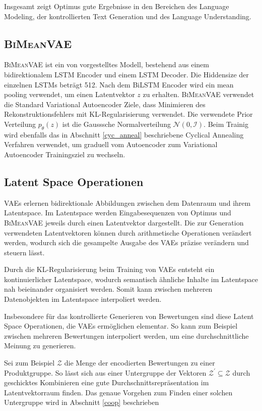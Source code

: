 Insgesamt zeigt Optimus gute Ergebnisse in den Bereichen des Language Modeling, der kontrollierten Text Generation und des Language Understanding.



\pagebreak
\subsection{\textsc{BiMeanVAE}}
\textsc{BiMeanVAE} ist ein von \citep{coop} vorgestelltes Modell, bestehend aus einem bidirektionalem LSTM Encoder und einem LSTM Decoder. 
Die Hiddensize der einzelnen LSTMs beträgt 512. Nach dem BiLSTM Encoder wird ein mean pooling verwendet, um einen Latentvektor $z$ zu erhalten.
\textsc{BiMeanVAE} verwendet die Standard Variational Autoencoder Ziele, dass Minimieren des Rekonstruktionsfehlers mit KL-Regularisierung verwendet.
Die verwendete Prior Verteilung $p_\theta(z)$ ist die Gausssche Normalverteilung $\mathcal{N}(0,\mathcal{I})$. 
Beim Trainig wird ebenfalls das in Abschnitt \ref{cyc_anneal} beschriebene Cyclical Annealing Verfahren verwendet, um graduell vom Autoencoder zum Variational Autoencoder Trainingsziel zu wechseln.


\subsection{Latent Space Operationen}
VAEs erlernen bidirektionale Abbildungen zwischen dem Datenraum und ihrem Latentspace. 
Im Latentspace werden Eingabesequenzen von Optimus und \textsc{BiMeanVAE} jeweils durch einen Latentvektor dargestellt.
Die zur Generation verwendeten Latentvektoren können durch arithmetische Operationen verändert werden, wodurch sich die gesampelte Ausgabe des VAEs präzise verändern und steuern lässt.

Durch die KL-Regularisierung beim Training von VAEs entsteht ein kontinuierlicher Latentspace, wodurch semantisch ähnliche Inhalte im Latentspace nah beieinander organisiert werden.
Somit kann zwischen mehreren Datenobjekten im Latentspace interpoliert werden.

Insbesondere für das kontrollierte Generieren von Bewertungen sind diese Latent Space Operationen, die VAEs ermöglichen elementar.
So kann zum Beispiel zwischen mehreren Bewertungen interpoliert werden, um eine durchschnittliche Meinung zu generieren.

Sei zum Beispiel $\mathcal{Z}$ die Menge der encodierten Bewertungen zu einer Produktgruppe.
So lässt sich aus einer Untergruppe der Vektoren $\mathcal{Z}^{'} \subseteq \mathcal{Z}$ durch geschicktes Kombinieren eine gute Durchschnittsrepräsentation im Latentvektorraum finden.
Das genaue Vorgehen zum Finden einer solchen Untergruppe wird in Abschnitt \ref{coop} beschrieben
\pagebreak
